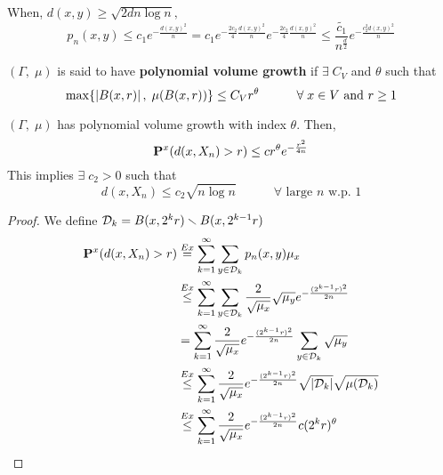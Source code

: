 \documentclass[main]{subfiles}
\begin{document}
When, $d(x,y) \geq \sqrt{2dn\log n},$
\[p_n(x,y) \leq c_1 e^{-\frac{d(x,y)^2}{n}} = c_1 e^{-\frac{2c_2}{4}\frac{d(x,y)^2}{n}} e^{-\frac{2c_2}{4}\frac{d(x,y)^2}{n}} \leq \frac{\widetilde{c_1}}{n^\frac{d}{2}} e^{-\frac{c_2^2d(x,y)^2}{n}}\]
\begin{definition}
    $(\Gamma,\;\mu)$ is said to have \textbf{polynomial volume growth} if $\exists\;C_V$ and $\theta$ such that
    \[\max\{\Mod{B(x,r)},\;\mu(B(x,r))\} \leq C_Vr^\theta \hspace{3em} \forall\;x \in V\text{ and }r \geq 1\]
\end{definition}
\begin{lemma}
    $(\Gamma,\;\mu)$ has polynomial volume growth with index $\theta.$ Then,
    \[\P^x(d(x, X_n) > r) \leq cr^\theta e^{-\frac{r^2}{4n}}\]
    This implies $\exists\;c_2>0$ such that
    \[d(x, X_n) \leq c_2 \sqrt{n\log n} \hspace{3em} \forall\text{ large }n\text{ w.p. }1\]
    \begin{proof}
        We define $\SD_k = B(x,2^kr) \smallsetminus B(x,2^{k-1}r)$
        \begin{align*}
            \P^x(d(x, X_n) > r) & \stackrel{Ex}{=} \sum_{k=1}^\infty \sum_{y \in \SD_k} p_n(x,y)\mu_x                                                           \\
                                & \stackrel{Ex}{\leq} \sum_{k=1}^\infty \sum_{y \in \SD_k} \frac{2}{\sqrt{\mu_x}}\sqrt{\mu_y}e^{-\frac{(2^{k-1}r)^2}{2n}}       \\
                                & = \sum_{k=1}^\infty \frac{2}{\sqrt{\mu_x}} e^{-\frac{(2^{k-1}r)^2}{2n}} \sum_{y \in \SD_k} \sqrt{\mu_y}                       \\
                                & \stackrel{Ex}{\leq} \sum_{k=1}^\infty \frac{2}{\sqrt{\mu_x}} e^{-\frac{(2^{k-1}r)^2}{2n}} \sqrt{\Mod{\SD_k}}\sqrt{\mu(\SD_k)} \\
                                & \stackrel{Ex}{\leq} \sum_{k=1}^\infty \frac{2}{\sqrt{\mu_x}} e^{-\frac{(2^{k-1}r)^2}{2n}} c(2^kr)^\theta                      \\
        \end{align*}
    \end{proof}
\end{lemma}
\end{document}
